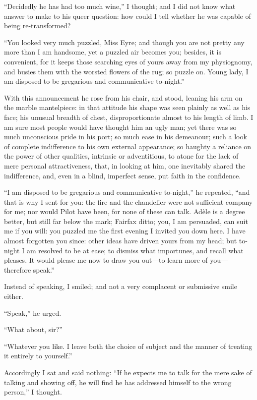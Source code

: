 \enquote{Decidedly he has had too much wine,} I thought; and I did not
know what answer to make to his queer question: how could I tell whether
he was capable of being re-transformed?

\enquote{You looked very much puzzled, Miss Eyre; and though you are not
	pretty any more than I am handsome, yet a puzzled air becomes you;
	besides, it is convenient, for it keeps those searching eyes of yours
	away from my physiognomy, and busies them with the worsted flowers of
	the rug; so puzzle on. Young lady, I am disposed to be gregarious and
	communicative to-night.}

With this announcement he rose from his chair, and stood, leaning his
arm on the marble mantelpiece: in that attitude his shape was seen
plainly as well as his face; his unusual breadth of chest,
disproportionate almost to his length of limb. I am sure most people
would have thought him an ugly man; yet there was so much unconscious
pride in his port; so much ease in his demeanour; such a look of
complete indifference to his own external appearance; so haughty a
reliance on the power of other qualities, intrinsic or adventitious, to
atone for the lack of mere personal attractiveness, that, in looking at
him, one inevitably shared the indifference, and, even in a blind,
imperfect sense, put faith in the confidence.

\enquote{I am disposed to be gregarious and communicative to-night,} he
repeated, \enquote{and that is why I sent for you: the fire and the
	chandelier were not sufficient company for me; nor would Pilot have
	been, for none of these can talk. Adèle is a degree better, but still
	far below the mark; \Mrs{} Fairfax ditto; you, I am persuaded, can suit me
	if you will: you puzzled me the first evening I invited you down here.
	I have almost forgotten you since: other ideas have driven yours from my
	head; but to-night I am resolved to be at ease; to dismiss what
	importunes, and recall what pleases. It would please me now to draw you
	out---to learn more of you---therefore speak.}

Instead of speaking, I smiled; and not a very complacent or submissive
smile either.

\enquote{Speak,} he urged.

\enquote{What about, sir?}

\enquote{Whatever you like. I leave both the choice of subject and the
	manner of treating it entirely to yourself.}

Accordingly I sat and said nothing: \enquote{If he expects me to talk
	for the mere sake of talking and showing off, he will find he has
	addressed himself to the wrong person,} I thought.


